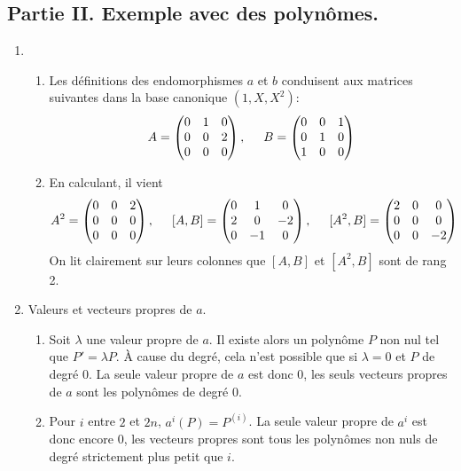 \subsection*{Partie II. Exemple avec des polynômes.}
\begin{enumerate}
\item
\begin{enumerate}
 \item Les définitions des endomorphismes $a$ et $b$ conduisent aux matrices suivantes dans la base canonique $(1,X,X^2)$:
\begin{displaymath}
A=
\begin{pmatrix}
0 & 1 & 0 \\ 0 & 0 & 2 \\ 0 & 0 & 0 
\end{pmatrix}
,\hspace{0.5cm}
B=
\begin{pmatrix}
0 & 0 & 1 \\ 0 & 1  & 0 \\ 1 & 0 & 0  
\end{pmatrix} 
\end{displaymath}

 \item En calculant, il vient
\begin{displaymath}
 A^2=
\begin{pmatrix}
0 & 0 & 2 \\ 0 & 0 & 0 \\ 0 & 0 & 0 
\end{pmatrix}
,\hspace{0.5cm}
[A,B]=
\begin{pmatrix}
0 & 1 & 0 \\ 2 & 0 & -2 \\ 0 & -1 & 0 
\end{pmatrix}
,\hspace{0.5cm}
[A^2,B]=
\begin{pmatrix}
2 & 0 & 0 \\ 0 & 0 & 0 \\ 0 & 0 & -2 
\end{pmatrix}
\end{displaymath}
On lit clairement sur leurs colonnes que $[A,B]$ et $[A^2,B]$ sont de rang 2.
\end{enumerate}

\item Valeurs et vecteurs propres de $a$.
\begin{enumerate}
 \item Soit $\lambda$ une valeur propre de $a$. Il existe alors un polynôme $P$ non nul tel que $P'=\lambda P$. \`A cause du degré, cela n'est possible que si $\lambda=0$ et $P$ de degré $0$. La seule valeur propre de $a$ est donc $0$, les seuls vecteurs propres de $a$ sont les polynômes de degré $0$.
 \item \label{vpa}Pour $i$ entre $2$ et $2n$, $a^i(P)=P^{(i)}$. La seule valeur propre de $a^i$ est donc encore $0$, les vecteurs propres sont tous les polynômes non nuls de degré strictement plus petit que $i$. 
\end{enumerate}


\end{enumerate}
